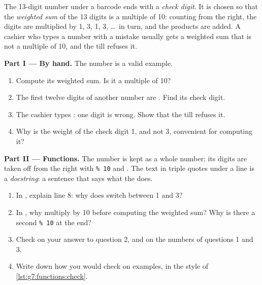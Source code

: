 \begin{problem}\label{pb:g7:functions:1}
The 13-digit number under a barcode ends with a \emph{check digit}. It is
chosen so that the \emph{weighted sum} of the 13 digits is a multiple of 10:
counting from the right, the digits are multiplied by 1, 3, 1, 3, \dots\ in
turn, and the products are added. A cashier who types a number with a mistake
usually gets a weighted sum that is not a multiple of 10, and the till refuses
it.

\medskip\noindent\textbf{Part I --- By hand.} The number 
is a valid example.
\begin{enumerate}
  \item Compute its weighted sum. Is it a multiple of 10?
  \item The first twelve digits of another number are .
    Find its check digit.
  \item The cashier types : one digit is wrong. Show that
    the till refuses it.
  \item Why is the weight of the check digit 1, and not 3, convenient for
    computing it?
\end{enumerate}

\medskip\noindent\textbf{Part II --- Functions.} The number is kept as a whole
number; its digits are taken off from the right with \texttt{\% 10} and
. The text in triple quotes under a  line is a
\emph{docstring}: a sentence that says what the  does.

\label{lst:g7:functions:barcode}

\begin{enumerate}[resume]
  \item In , explain line 8: why does 
    switch between 1 and 3?
  \item In , why multiply  by 10 before
    computing the weighted sum? Why is there a second \texttt{\% 10} at the end?
  \item Check  on your answer to question 2, and
     on the numbers of questions 1 and 3.
  \item Write down how you would check  on examples, in the
    style of \cref{lst:g7:functions:check}.
\end{enumerate}


\end{problem}
